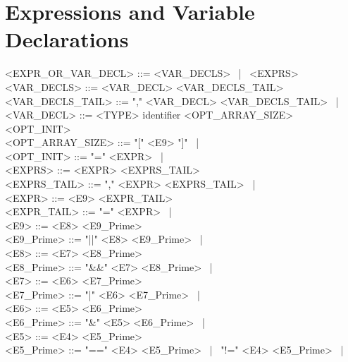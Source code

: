 \section{Expressions and Variable Declarations}
\begin{grammar}
<EXPR_OR_VAR_DECL> ::= <VAR_DECLS> \ | \ <EXPRS> \\

<VAR_DECLS> ::= <VAR_DECL> <VAR_DECLS_TAIL> \\

<VAR_DECLS_TAIL> ::= "," <VAR_DECL> <VAR_DECLS_TAIL> \ | \ \epsilon \\

<VAR_DECL> ::= <TYPE> identifier <OPT_ARRAY_SIZE> <OPT_INIT> \\

<OPT_ARRAY_SIZE> ::= "[" <E9> "]" \ | \ \epsilon \\

<OPT_INIT> ::= "=" <EXPR> \ | \ \epsilon \\

<EXPRS> ::= <EXPR> <EXPRS_TAIL> \\

<EXPRS_TAIL> ::= "," <EXPR> <EXPRS_TAIL> \ | \ \epsilon \\

<EXPR> ::= <E9> <EXPR_TAIL> \\

<EXPR_TAIL> ::= "=" <EXPR> \ | \ \epsilon \\

<E9> ::= <E8> <E9_Prime> \\
<E9_Prime> ::= "||" <E8> <E9_Prime> \ | \ \epsilon \\

<E8> ::= <E7> <E8_Prime> \\
<E8_Prime> ::= "&&" <E7> <E8_Prime> \ | \ \epsilon \\

<E7> ::= <E6> <E7_Prime> \\
<E7_Prime> ::= "|" <E6> <E7_Prime> \ | \ \epsilon \\

<E6> ::= <E5> <E6_Prime> \\
<E6_Prime> ::= "&" <E5> <E6_Prime> \ | \ \epsilon \\

<E5> ::= <E4> <E5_Prime> \\
<E5_Prime> ::= "==" <E4> <E5_Prime> \ | \ "!=" <E4> <E5_Prime> \ | \ \epsilon \\


\end{grammar}
